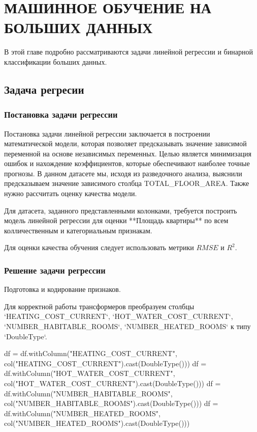 %
\chapter{\MakeUppercase{Машинное обучение на больших данных}}\label{ch:second}

\vspace{\baselineskip}
В этой главе подробно рассматриваются задачи линейной регрессии и бинарной классификации больших данных.
\vspace{\baselineskip}

\section{Задача регресии}
\subsection{Постановка задачи регрессии}\vspace{\baselineskip}

Постановка задачи линейной регрессии заключается в построении математической модели, которая позволяет предсказывать значение зависимой переменной на основе независимых переменных. Целью является минимизация ошибок и нахождение коэффициентов, которые обеспечивают наиболее точные прогнозы. В данном датасете мы, исходя из разведочного анализа, выяснили предсказываем значение зависимого столбца TOTAL\_FLOOR\_AREA. Также нужно рассчитать оценку качества модели.

Для датасета, заданного представленными колонками, требуется построить модель линейной регрессии для оценки **Площадь квартиры** по всем колличественным и категориальным признакам. 

Для оценки качества обучения следует использовать метрики $RMSE$ и $R^2$.

\vspace{\baselineskip}\subsection{Решение задачи регрессии}\vspace{\baselineskip}

\par Подготовка и кодирование признаков.
\par Для корректной работы трансформеров преобразуем столбцы `HEATING\_COST\_CURRENT`, `HOT\_WATER\_COST\_CURRENT`, `NUMBER\_HABITABLE\_ROOMS`, `NUMBER\_HEATED\_ROOMS` к типу `DoubleType`.
\begin{code}
df = df.withColumn("HEATING_COST_CURRENT", col("HEATING_COST_CURRENT").cast(DoubleType()))
df = df.withColumn("HOT_WATER_COST_CURRENT", col("HOT_WATER_COST_CURRENT").cast(DoubleType()))
df = df.withColumn("NUMBER_HABITABLE_ROOMS", col("NUMBER_HABITABLE_ROOMS").cast(DoubleType()))
df = df.withColumn("NUMBER_HEATED_ROOMS", col("NUMBER_HEATED_ROOMS").cast(DoubleType()))
\end{code}


